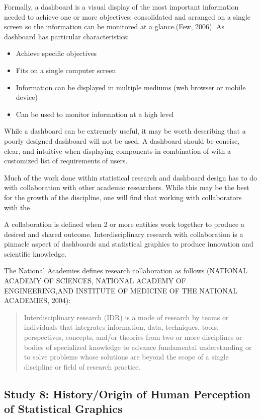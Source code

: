 \documentclass[print]{nuthesis}
\providecommand{\tightlist}{%
  \setlength{\itemsep}{0pt}\setlength{\parskip}{0pt}}
\begin{document}
Formally, a dashboard is a visual display of the most important information needed to achieve one or more objectives; consolidated and arranged on a single screen so the information can be monitored at a glance.(Few, 2006). As dashboard has particular characteristics:

\begin{itemize}
\tightlist
\item
  Achieve specific objectives
\item
  Fits on a single computer screen
\item
  Information can be displayed in multiple mediums (web browser or mobile device)
\item
  Can be used to monitor information at a high level
\end{itemize}

While a dashboard can be extremely useful, it may be worth describing that a poorly designed dashboard will not be used. A dashboard should be concise, clear, and intuitive when displaying components in combination of with a customized list of requirements of users.

Much of the work done within statistical research and dashboard design has to do with collaboration with other academic researchers. While this may be the best for the growth of the discipline, one will find that working with collaborators with the

A collaboration is defined when 2 or more entities work together to produce a desired and shared outcome. Interdisciplinary research with collaboration is a pinnacle aspect of dashboards and statistical graphics to produce innovation and scientific knowledge.

The National Academies defines research collaboration as follows (NATIONAL ACADEMY OF SCIENCES, NATIONAL ACADEMY OF ENGINEERING,AND INSTITUTE OF MEDICINE OF THE NATIONAL ACADEMIES, 2004):

\begin{quote}
Interdisciplinary research (IDR) is a mode of research by teams or individuals that integrates information, data, techniques, tools, perspectives, concepts, and/or theories from two or more disciplines or bodies of specialized knowledge to advance fundamental understanding or to solve problems whose solutions are beyond the scope of a single discipline or field of research practice.
\end{quote}

\hypertarget{study-8-historyorigin-of-human-perception-of-statistical-graphics}{%
\subsection{Study 8: History/Origin of Human Perception of Statistical Graphics}\label{study-8-historyorigin-of-human-perception-of-statistical-graphics}}
\end{document}
